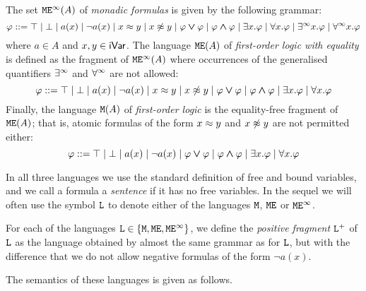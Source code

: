 \begin{definition}
The set $\mathtt{M}\mathtt{E}^{\infty}(A)$ of \emph{monadic formulas} is given by the following grammar:
{\small \[ \varphi  \mathrel{::=} 
\top \mid \bot 
\mid a(x)
\mid \neg a(x)
\mid x \approx y
\mid x \not\approx y
\mid \varphi \mathbin{\mbox{\boldmath$\vee$}} \varphi
\mid \varphi \mathbin{\mbox{\boldmath$\wedge$}} \varphi
\mid \exists x.\varphi
\mid \forall x.\varphi
\mid \exists^\infty x.\varphi
\mid \forall^\infty x.\varphi
\]
}
where $a \in A$ and $x,y\in \mathsf{iVar}$. 
The language $\mathtt{M}\mathtt{E}(A)$ of \emph{first-order logic with equality} is defined as
the fragment of $\mathtt{M}\mathtt{E}^{\infty}(A)$ where occurrences of the generalised quantifiers 
$\exists^\infty$ and $\forall^\infty$ are not allowed:
\[
\varphi \mathrel{::=}
\top \mid \bot 
\mid a(x)
\mid \neg a(x)
\mid x \approx y
\mid x \not\approx y
\mid \varphi \mathbin{\mbox{\boldmath$\vee$}} \varphi
\mid \varphi \mathbin{\mbox{\boldmath$\wedge$}} \varphi
\mid \exists x.\varphi
\mid \forall x.\varphi
\]
Finally, the language $\mathtt{M}(A)$ of \emph{first-order logic} is the equality-free
fragment of $\mathtt{M}\mathtt{E}(A)$; that is, atomic formulas of the form $x \approx y$ and 
$x \not\approx y$ are not permitted either:
\[
\varphi \mathrel{::=}
\top \mid \bot 
\mid a(x)
\mid \neg a(x)
\mid \varphi \mathbin{\mbox{\boldmath$\vee$}} \varphi
\mid \varphi \mathbin{\mbox{\boldmath$\wedge$}} \varphi
\mid \exists x.\varphi
\mid \forall x.\varphi
\]

In all three languages we use the standard definition of free and bound
variables, and we call a formula a \emph{sentence} if it has no free variables.
In the sequel we will often use the symbol $\mathtt{L}$ to denote either of the 
languages $\mathtt{M}$, $\mathtt{M}\mathtt{E}$ or $\mathtt{M}\mathtt{E}^{\infty}$.

For each of the languages $\mathtt{L} \in \{ \mathtt{M}, \mathtt{M}\mathtt{E}, \mathtt{M}\mathtt{E}^{\infty} \}$, we define the 
\emph{positive fragment} $\mathtt{L}^{+}$ of $\mathtt{L}$ as the language obtained by 
almost the same grammar as for $\mathtt{L}$, but with the difference that we do not
allow negative formulas of the form $\neg a(x)$.
\end{definition}

\noindent

The semantics of these languages is given as follows. 

